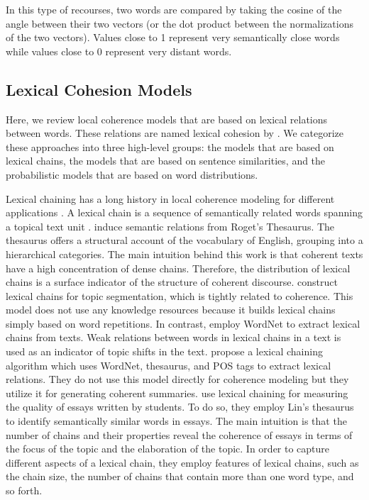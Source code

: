 In this type of recourses, two words are compared by taking the cosine of the angle between their two vectors (or the dot product between the normalizations of the two vectors). 
Values close to 1 represent very semantically close words while values close to 0 represent very distant words. 

\subsection{Lexical Cohesion Models}

Here, we review local coherence models that are based on lexical relations between words. 
These relations are named lexical cohesion by . 
We categorize these approaches into three high-level groups: the models that are based on lexical chains, the models that are based on sentence similarities, and the probabilistic models that are based on word distributions.  

Lexical chaining has a long history in local coherence modeling for different applications \cite{morris91,fenglijun09,wongbillytm12,benguosheng13,flor13}. 
A lexical chain is a sequence of semantically related words spanning a topical text unit \cite{morris91}. 
 induce semantic relations from Roget's Thesaurus. 
The thesaurus offers a structural account of the vocabulary of English, grouping into a hierarchical  categories. 
The main intuition behind this work is that coherent texts have a high concentration of dense chains. 
Therefore, the distribution of lexical chains is a surface indicator of the structure of coherent discourse. 
 construct lexical chains for topic segmentation, which is tightly related to coherence. 
This model does not use any knowledge resources because it builds lexical chains simply based on word repetitions. 
In contrast,  employ WordNet to extract lexical chains from texts.  
Weak relations between words in lexical chains in a text is used as an indicator of topic shifts in the text. 
 propose a lexical chaining algorithm which uses WordNet, thesaurus, and POS tags to extract lexical relations. 
They do not use this model directly for coherence modeling but they utilize it for generating coherent summaries. 
 use lexical chaining for measuring the quality of essays written by students. 
To do so, they employ Lin’s thesaurus \cite{lindekang98} to identify semantically similar words in essays.   
The main intuition is that the number of chains and their properties reveal the coherence of essays in terms of the focus of the topic and the elaboration of the topic. 
In order to capture different aspects of a lexical chain, they employ features of lexical chains, such as the chain size, the number of chains that contain more than one word type, and so forth. 

